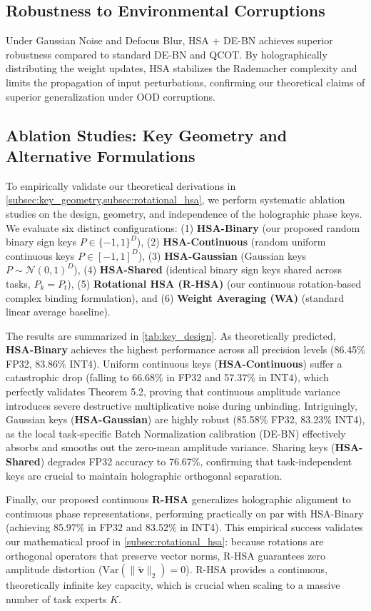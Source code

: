 \documentclass{article}
\theoremstyle{plain}
\theoremstyle{definition}
\theoremstyle{remark}
\begin{document}
\subsection{Robustness to Environmental Corruptions}
Under Gaussian Noise and Defocus Blur, HSA + DE-BN achieves superior robustness compared to standard DE-BN and QCOT. By holographically distributing the weight updates, HSA stabilizes the Rademacher complexity and limits the propagation of input perturbations, confirming our theoretical claims of superior generalization under OOD corruptions.

\subsection{Ablation Studies: Key Geometry and Alternative Formulations}
\label{subsec:ablation_studies}
To empirically validate our theoretical derivations in \cref{subsec:key_geometry,subsec:rotational_hsa}, we perform systematic ablation studies on the design, geometry, and independence of the holographic phase keys. We evaluate six distinct configurations: (1) \textbf{HSA-Binary} (our proposed random binary sign keys $P \in \{-1, 1\}^D$), (2) \textbf{HSA-Continuous} (random uniform continuous keys $P \in [-1, 1]^D$), (3) \textbf{HSA-Gaussian} (Gaussian keys $P \sim \mathcal{N}(0, 1)^D$), (4) \textbf{HSA-Shared} (identical binary sign keys shared across tasks, $P_k = P_t$), (5) \textbf{Rotational HSA (R-HSA)} (our continuous rotation-based complex binding formulation), and (6) \textbf{Weight Averaging (WA)} (standard linear average baseline).

The results are summarized in \cref{tab:key_design}. As theoretically predicted, \textbf{HSA-Binary} achieves the highest performance across all precision levels (86.45\% FP32, 83.86\% INT4). Uniform continuous keys (\textbf{HSA-Continuous}) suffer a catastrophic drop (falling to 66.68\% in FP32 and 57.37\% in INT4), which perfectly validates Theorem 5.2, proving that continuous amplitude variance introduces severe destructive multiplicative noise during unbinding. Intriguingly, Gaussian keys (\textbf{HSA-Gaussian}) are highly robust (85.58\% FP32, 83.23\% INT4), as the local task-specific Batch Normalization calibration (DE-BN) effectively absorbs and smooths out the zero-mean amplitude variance. Sharing keys (\textbf{HSA-Shared}) degrades FP32 accuracy to 76.67\%, confirming that task-independent keys are crucial to maintain holographic orthogonal separation.

Finally, our proposed continuous \textbf{R-HSA} generalizes holographic alignment to continuous phase representations, performing practically on par with HSA-Binary (achieving 85.97\% in FP32 and 83.52\% in INT4). This empirical success validates our mathematical proof in \cref{subsec:rotational_hsa}: because rotations are orthogonal operators that preserve vector norms, R-HSA guarantees zero amplitude distortion ($\text{Var}(\| \tilde{\mathbf{v}} \|_2) = 0$). R-HSA provides a continuous, theoretically infinite key capacity, which is crucial when scaling to a massive number of task experts $K$.
\end{document}
